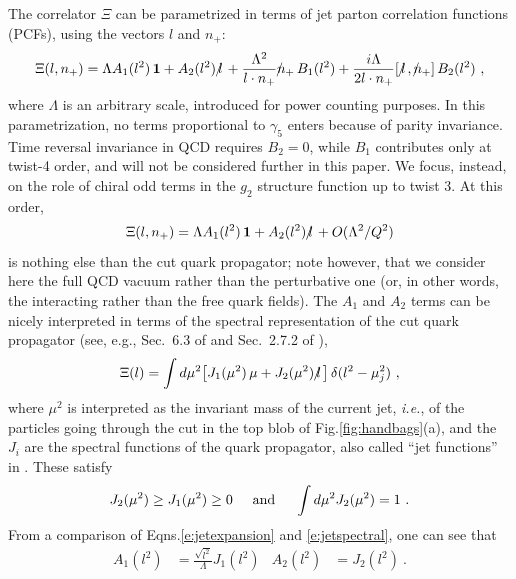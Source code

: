 \documentclass[preprintnumbers,floatfix,nofootinbib]{revtex4}
\newcommand{\lslash}{l \hspace{-0.19cm} / \,}
\newcommand{\nslash}{n \hspace{-0.24cm} / \,}
\begin{document}
The correlator $\Xi$ can be parametrized in terms of jet parton correlation
functions (PCFs), using the vectors $l$ and $n_+$: 
\begin{equation}
\Xi(l,n_+) = \Lambda A_1(l^2)\,{\bm 1} + A_2(l^2)\,\lslash 
+ \frac{\Lambda^2}{l \cdot n_{+}} \nslash_+ \, B_{1}(l^2)
+ \frac{i \Lambda}{2 l \cdot n_{+}} [\,\lslash,\nslash_+ ] \, B_{2}(l^2) \ ,
\label{e:jetexpansion}
\end{equation} 
where $\Lambda$ is an arbitrary scale, introduced for power counting purposes.
In this parametrization, no terms proportional to $\gamma_5$ enters because of parity invariance. Time reversal invariance in QCD requires $B_{2}=0$, while $B_{1}$ contributes only at twist-4 order, and will not be considered further in this paper. We focus, instead, on the role of chiral odd terms in the $g_2$ structure function up to twist 3. At this order, 
\begin{equation}
  \Xi(l,n_+) = \Lambda A_1(l^2)\,{\bm 1} + A_2(l^2)\,\lslash 
    + O(\Lambda^2/Q^2)
\label{e:jetexpansion-tw3}
\end{equation} 
is nothing else than the cut quark propagator; note however, that we consider
here the full QCD vacuum rather than the perturbative one (or, in other words, the interacting rather than the free quark fields).
The $A_1$ and $A_2$ terms can be nicely interpreted in terms of the spectral
representation of the cut quark propagator (see, e.g., Sec.~6.3 of
\cite{D'Hoker:2004aa} and Sec.~2.7.2 of \cite{Romao:2013aa}),
\begin{align} 
  \Xi(l) =  
  \int d \mu^2 \big[ J_1 (\mu^2)\,\mu + J_2 (\mu^2)\,\lslash \big] \,
  \delta(l^2 -\mu_j^2) \ ,
\label{e:jetspectral}
\end{align}
where $\mu^2$ is interpreted as the invariant mass of the current jet, {\it
  i.e.}, of the particles going through the cut in the top blob of
Fig.\ref{fig:handbags}(a), and the $J_i$ are the spectral functions of the
quark propagator, also called ``jet functions'' in
\cite{Accardi:2008ne}. These satisfy
\begin{align}
  J_2(\mu^2) \geq J_1(\mu^2) \geq 0
  \hspace*{0.5cm} \text{and} \hspace*{0.5cm}
  \int d\mu^2 J_2(\mu^2) = 1 \ .
\label{eq:jetfnsprops}
\end{align}
From a comparison of Eqns.\eqref{e:jetexpansion} and \eqref{e:jetspectral}, one can see that 
\begin{align}
  A_1(l^2)&=\frac{\sqrt{l^2}}{\Lambda}J_1(l^2) & A_2(l^2)&=J_2(l^2) \ .
  \label{eq:jet_vs_spectral}
\end{align}
\end{document}
